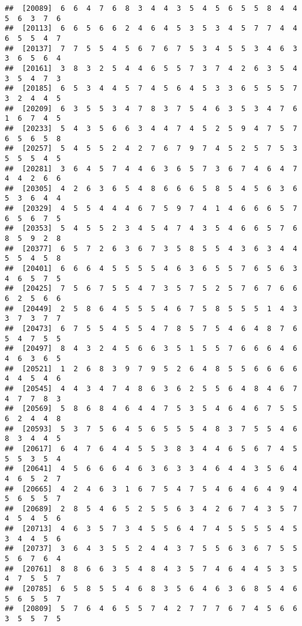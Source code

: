 \documentclass[
]{book}
\begin{document}
\begin{verbatim}
##  [20089]  6  6  4  7  6  8  3  4  4  3  5  4  5  6  5  5  8  4  4  5  6  3  7  6
##  [20113]  6  6  5  6  6  2  4  6  4  5  3  5  3  4  5  7  7  4  4  6  5  5  4  7
##  [20137]  7  7  5  5  4  5  6  7  6  7  5  3  4  5  5  3  4  6  3  3  6  5  6  4
##  [20161]  3  8  3  2  5  4  4  6  5  5  7  3  7  4  2  6  3  5  4  3  5  4  7  3
##  [20185]  6  5  3  4  4  5  7  4  5  6  4  5  3  3  6  5  5  5  7  3  2  4  4  5
##  [20209]  6  3  5  5  3  4  7  8  3  7  5  4  6  3  5  3  4  7  6  1  6  7  4  5
##  [20233]  5  4  3  5  6  6  3  4  4  7  4  5  2  5  9  4  7  5  7  6  5  6  5  8
##  [20257]  5  4  5  5  2  4  2  7  6  7  9  7  4  5  2  5  7  5  3  5  5  5  4  5
##  [20281]  3  6  4  5  7  4  4  6  3  6  5  7  3  6  7  4  6  4  7  4  4  2  6  6
##  [20305]  4  2  6  3  6  5  4  8  6  6  6  5  8  5  4  5  6  3  6  5  3  6  4  4
##  [20329]  4  5  5  4  4  4  6  7  5  9  7  4  1  4  6  6  6  5  7  6  5  6  7  5
##  [20353]  5  4  5  5  2  3  4  5  4  7  4  3  5  4  6  6  5  7  6  8  5  9  2  8
##  [20377]  6  5  7  2  6  3  6  7  3  5  8  5  5  4  3  6  3  4  4  5  5  4  5  8
##  [20401]  6  6  6  4  5  5  5  5  4  6  3  6  5  5  7  6  5  6  3  4  6  5  7  5
##  [20425]  7  5  6  7  5  5  4  7  3  5  7  5  2  5  7  6  7  6  6  6  2  5  6  6
##  [20449]  2  5  8  6  4  5  5  5  4  6  7  5  8  5  5  5  1  4  3  3  7  3  7  7
##  [20473]  6  7  5  5  4  5  5  4  7  8  5  7  5  4  6  4  8  7  6  5  4  7  5  5
##  [20497]  8  4  3  2  4  5  6  6  3  5  1  5  5  7  6  6  6  4  6  4  6  3  6  5
##  [20521]  1  2  6  8  3  9  7  9  5  2  6  4  8  5  5  6  6  6  6  4  4  5  4  6
##  [20545]  4  4  3  4  7  4  8  6  3  6  2  5  5  6  4  8  4  6  7  4  7  7  8  3
##  [20569]  5  8  6  8  4  6  4  4  7  5  3  5  4  6  4  6  7  5  5  6  2  4  4  8
##  [20593]  5  3  7  5  6  4  5  6  5  5  5  4  8  3  7  5  5  4  6  8  3  4  4  5
##  [20617]  6  4  7  6  4  4  5  5  3  8  3  4  4  6  5  6  7  4  5  5  5  3  5  4
##  [20641]  4  5  6  6  6  4  6  3  6  3  3  4  6  4  4  3  5  6  4  4  6  5  2  7
##  [20665]  4  2  4  6  3  1  6  7  5  4  7  5  4  6  4  6  4  9  4  5  6  5  5  7
##  [20689]  2  8  5  4  6  5  2  5  5  6  3  4  2  6  7  4  3  5  7  4  5  4  5  6
##  [20713]  4  6  3  5  7  3  4  5  5  6  4  7  4  5  5  5  5  4  5  3  4  4  5  6
##  [20737]  3  6  4  3  5  5  2  4  4  3  7  5  5  6  3  6  7  5  5  5  6  7  6  4
##  [20761]  8  8  6  6  3  5  4  8  4  3  5  7  4  6  4  4  5  3  5  4  7  5  5  7
##  [20785]  6  5  8  5  5  4  6  8  3  5  6  4  6  3  6  8  5  4  6  5  6  5  5  7
##  [20809]  5  7  6  4  6  5  5  7  4  2  7  7  7  6  7  4  5  6  6  3  5  5  7  5

\end{verbatim}
\end{document}
